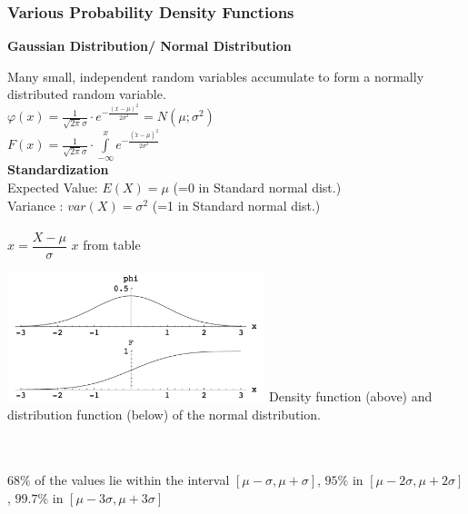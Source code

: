     \subsubsection{Various Probability Density Functions}
        \textbf{Gaussian Distribution/ Normal Distribution}\\
        \begin{minipage}{10cm}
        Many small, independent random variables accumulate to form a
        normally distributed random variable.\\
         $\varphi(x)=\frac{1}{\sqrt{2
        \pi}\sigma}\cdot e^{-\frac{(x-\mu)^2}{2\sigma^2}} = N(\mu ; \sigma^2) $\\ 
        $F(x)=\frac{1}{\sqrt{2
        \pi}\sigma}\cdot \int\limits^{x}_{-\infty}{e^{-\frac{(\tilde{x} -\mu)^2}{2\sigma^2}}} $ \\
        \textbf{Standardization}\\
        Expected Value: $E(X)=\mu$ \hspace{4mm}(=0 in Standard normal dist.)\\ 
        Variance \hspace{11.5mm}: $var(X)=\sigma^2$ (=1 in Standard normal dist.)\\ \\
        $x=\dfrac{X-\mu}{\sigma}$ \hspace{5mm} $x$ from table
        \end{minipage}
        \hspace{5mm}
        \begin{minipage}{7.5cm}
        \includegraphics[width=7.5cm]{bilder/normalverteilung.png}
        Density function (above) and distribution function (below) of the normal distribution. 
        \end{minipage} \\ \\
        $ 68\% $ of the values lie within the interval $[ \mu - \sigma, \mu + \sigma]$, 
        $95\% $ in $[ \mu - 2\sigma, \mu + 2\sigma]$,    
        $99.7\% $ in $[ \mu - 3\sigma, \mu + 3\sigma]$\\\\
